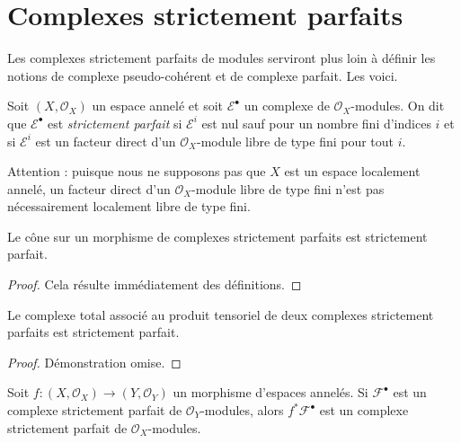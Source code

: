 \section{Complexes strictement parfaits}

\label{section-strictly-perfect}

\noindent
Les complexes strictement parfaits de modules serviront plus loin à définir les notions de complexe pseudo-cohérent et de complexe parfait. Les voici.

\begin{definition}

\label{definition-strictly-perfect}
Soit $(X, \mathcal{O}_X)$ un espace annelé et soit $\mathcal{E}^\bullet$ un complexe de $\mathcal{O}_X$-modules. On dit que $\mathcal{E}^\bullet$ est {\it strictement parfait} si $\mathcal{E}^i$ est nul sauf pour un nombre fini d'indices $i$ et si $\mathcal{E}^i$ est un facteur direct d'un $\mathcal{O}_X$-module libre de type fini pour tout $i$.
\end{definition}

\noindent
Attention : puisque nous ne supposons pas que $X$ est un espace localement annelé, un facteur direct d'un $\mathcal{O}_X$-module libre de type fini n'est pas nécessairement localement libre de type fini.

\begin{lemma}

\label{lemma-cone}

Le cône sur un morphisme de complexes strictement parfaits est strictement parfait.

\end{lemma}

\begin{proof}
Cela résulte immédiatement des définitions.
\end{proof}

\begin{lemma}

\label{lemma-tensor}

Le complexe total associé au produit tensoriel de deux complexes strictement parfaits est strictement parfait.

\end{lemma}

\begin{proof}
Démonstration omise.
\end{proof}

\begin{lemma}

\label{lemma-strictly-perfect-pullback}

Soit $f : (X, \mathcal{O}_X) \to (Y, \mathcal{O}_Y)$
un morphisme d'espaces annelés. Si $\mathcal{F}^\bullet$ est un complexe strictement parfait de $\mathcal{O}_Y$-modules, alors
$f^*\mathcal{F}^\bullet$ est un complexe strictement parfait de
$\mathcal{O}_X$-modules.

\end{lemma}


